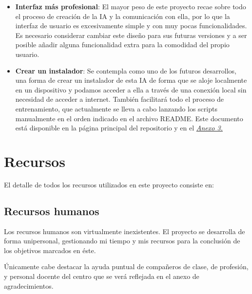 \documentclass{article}
\begin{document}
\begin{itemize}
	\item \textbf{Interfaz más profesional}: El mayor peso de este proyecto recae sobre todo el proceso de creación de la IA y la comunicación con ella, por lo que la interfaz de usuario es excesivamente simple y con muy pocas funcionalidades. Es necesario considerar cambiar este diseño para sus futuras versiones y a ser posible añadir alguna funcionalidad extra para la comodidad del propio usuario.
	\item \textbf{Crear un instalador}: Se contempla como uno de los futuros desarrollos, una forma de crear un instalador de esta IA de forma que se aloje localmente en un dispositivo y podamos acceder a ella a través de una conexión local sin necesidad de acceder a internet. También facilitará todo el proceso de entrenamiento, que actualmente se lleva a cabo lanzando los scripts manualmente en el orden indicado en el archivo README. Este documento está disponible en la página principal del repositorio y en el \hyperref[sec:DevGuide]{\textit{Anexo 3.}}
\end{itemize}



\newpage
\section{Recursos}
\label{sec:Resources}

\noindent El detalle de todos los recursos utilizados en este proyecto consiste en:
\subsection{Recursos humanos}
\label{sec:HumanRes}

Los recursos humanos son virtualmente inexistentes. El proyecto se desarrolla de forma unipersonal, gestionando mi tiempo y mis recursos para la conclusión de los objetivos marcados en éste.

Únicamente cabe destacar la ayuda puntual de compañeros de clase, de profesión, y personal docente del centro que se verá reflejada en el anexo de agradecimientos.
\end{document}
